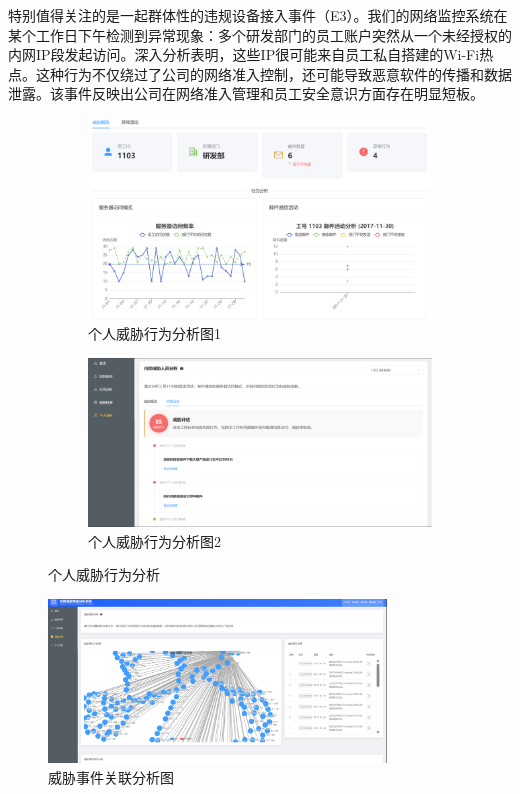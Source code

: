 \documentclass[UTF8,12pt]{ctexart}
\begin{document}
特别值得关注的是一起群体性的违规设备接入事件（E3）。我们的网络监控系统在某个工作日下午检测到异常现象：多个研发部门的员工账户突然从一个未经授权的内网IP段发起访问。深入分析表明，这些IP很可能来自员工私自搭建的Wi-Fi热点。这种行为不仅绕过了公司的网络准入控制，还可能导致恶意软件的传播和数据泄露。该事件反映出公司在网络准入管理和员工安全意识方面存在明显短板。

\begin{figure}[H]
    \centering
    \begin{subfigure}{0.48\textwidth}
        \includegraphics[width=\textwidth]{person_threat1.png}
        \caption{个人威胁行为分析图1}
        \label{fig:person_threat1}
    \end{subfigure}
    \begin{subfigure}{0.48\textwidth}
        \includegraphics[width=\textwidth]{person_threat2.png}
        \caption{个人威胁行为分析图2}
        \label{fig:person_threat2}
    \end{subfigure}
    \caption{个人威胁行为分析}
    \label{fig:person_threats}
\end{figure}

\begin{figure}[H]
    \centering
    \includegraphics[width=0.8\textwidth]{threat.png}
    \caption{威胁事件关联分析图}
    \label{fig:threat_analysis}
\end{figure}
\end{document}
